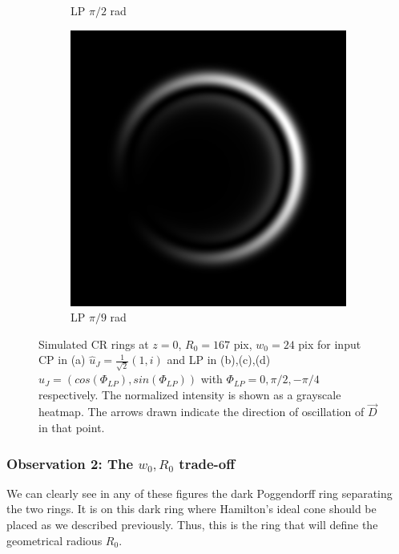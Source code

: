 \documentclass[11pt, a4paper, twoside]{article} %
\begin{document}
\begin{figure}[h!]
\begin{subfigure}[b]{0.245\linewidth}
     \caption{LP $\pi/2$ rad}
     \end{subfigure}
  \begin{subfigure}[b]{0.245\linewidth}
     \includegraphics[width=\linewidth]{simul24.png}
     \caption{LP $\pi/9$ rad}
     \end{subfigure}
    \caption{Simulated CR rings at $z=0$, $R_0=167$ pix, $w_0=24$ pix for input CP in (a) $\hat{u}_J=\frac{1}{\sqrt{2}}(1,i)$ and LP in (b),(c),(d) $\hat{u}_J=(cos(\Phi_{LP}),sin(\Phi_{LP}))$ with $\Phi_{LP}=0,\pi/2,-\pi/4$ respectively. The normalized intensity is shown as a grayscale heatmap. The arrows drawn indicate the direction of oscillation of $\vec{D}$ in that point.}
            \label{fig:simul2}

\end{figure}

\subsubsection*{Observation 2: The $w_0,R_0$ trade-off}
We can clearly see in any of these figures the dark Poggendorff ring separating the two rings. It is on this dark ring where Hamilton's ideal cone should be placed as we described previously. Thus, this is the ring that will define the geometrical radious $R_0$. 
\end{document}
